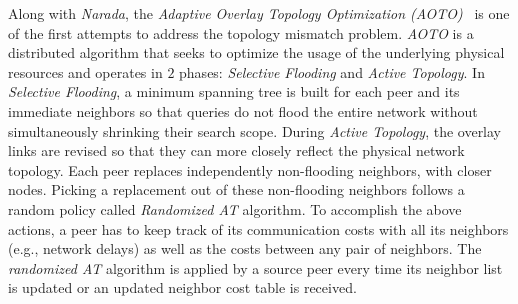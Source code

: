 Along with {\sl Narada}, the \emph{Adaptive Overlay Topology 
Optimization (AOTO)}~\cite{LZXN2003} is one
of the first attempts to address the topology mismatch problem. 
\emph{AOTO} is a distributed algorithm that seeks to optimize the usage of
the underlying physical resources and operates in $2$ phases:
\emph{Selective Flooding} and \emph{Active Topology}.
In \emph{Selective Flooding}, a minimum
spanning tree is built 
for each peer and its immediate neighbors so that
queries do not flood the entire network 
without simultaneously shrinking their search scope. 
During \emph{Active Topology}, the overlay
links are revised so that they can more closely reflect 
the physical network topology. 
Each peer replaces independently non-flooding neighbors, with closer nodes.
Picking a replacement out of these non-flooding
neighbors follows a random policy called \emph{Randomized AT} algorithm.
To accomplish the above actions, a peer has to keep track of 
its communication costs with all its neighbors (e.g., network delays)
as well as the costs between any pair of neighbors.
The \emph{randomized AT} algorithm is applied by a source peer 
every time its neighbor list is updated or an updated neighbor cost 
table is received.
%
%
